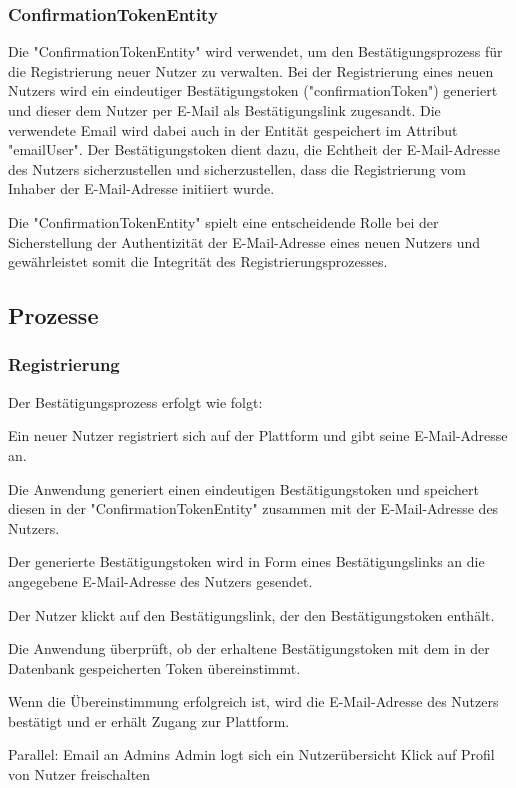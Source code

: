 \documentclass[fontsize=12pt,openright,oneside,paper=a4,BCOR=1cm]{scrbook}
\begin{document}
\subsubsection{ConfirmationTokenEntity}
Die "ConfirmationTokenEntity" wird verwendet, um den Bestätigungsprozess für die Registrierung neuer Nutzer zu verwalten. Bei der Registrierung eines neuen Nutzers wird ein eindeutiger Bestätigungstoken ("confirmationToken") generiert und dieser dem Nutzer per E-Mail als Bestätigungslink zugesandt. Die verwendete Email wird dabei auch in der Entität gespeichert im Attribut "emailUser". Der Bestätigungstoken dient dazu, die Echtheit der E-Mail-Adresse des Nutzers sicherzustellen und sicherzustellen, dass die Registrierung vom Inhaber der E-Mail-Adresse initiiert wurde.

Die "ConfirmationTokenEntity" spielt eine entscheidende Rolle bei der Sicherstellung der Authentizität der E-Mail-Adresse eines neuen Nutzers und gewährleistet somit die Integrität des Registrierungsprozesses.

\subsection{Prozesse}

\subsubsection{Registrierung}

Der Bestätigungsprozess erfolgt wie folgt:

    Ein neuer Nutzer registriert sich auf der Plattform und gibt seine E-Mail-Adresse an.

    Die Anwendung generiert einen eindeutigen Bestätigungstoken und speichert diesen in der "ConfirmationTokenEntity" zusammen mit der E-Mail-Adresse des Nutzers.

    Der generierte Bestätigungstoken wird in Form eines Bestätigungslinks an die angegebene E-Mail-Adresse des Nutzers gesendet.

    Der Nutzer klickt auf den Bestätigungslink, der den Bestätigungstoken enthält.

    Die Anwendung überprüft, ob der erhaltene Bestätigungstoken mit dem in der Datenbank gespeicherten Token übereinstimmt.

    Wenn die Übereinstimmung erfolgreich ist, wird die E-Mail-Adresse des Nutzers bestätigt und er erhält Zugang zur Plattform.

Parallel: 
Email an Admins
Admin logt sich ein 
Nutzerübersicht
Klick auf Profil von Nutzer
freischalten
\end{document}
